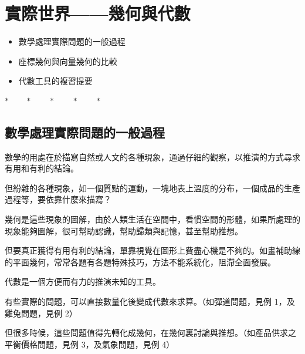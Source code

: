 
\section{實際世界——幾何與代數}
\label{sec:b3-ch1}

\begin{center}
\begin{minipage}{0.65\textwidth}
\begin{itemize}[leftmargin=2em, itemsep=0.3em]
  \item[§1-1] 數學處理實際問題的一般過程
  \item[§1-2] 座標幾何與向量幾何的比較
  \item[§1-3] 代數工具的複習提要
\end{itemize}
\end{minipage}
\end{center}

\begin{center}
$* \qquad * \qquad * \qquad * \qquad *$
\end{center}

\subsection{數學處理實際問題的一般過程}
\label{subsec:b3-1-1}

數學的用處在於描寫自然或人文的各種現象，通過仔細的觀察，以推演的方式尋求有用和有利的結論。

但紛雜的各種現象，如一個質點的運動，一塊地表上溫度的分布，一個成品的生產過程等，要依靠什麼來描寫？

幾何是這些現象的圖解，由於人類生活在空間中，看慣空間的形體，如果所處理的現象能夠圖解，很可幫助認識，幫助歸類與記憶，甚至幫助推想。

但要真正獲得有用有利的結論，單靠視覺在圖形上費盡心機是不夠的。如畫補助線的平面幾何，常常各題有各題特殊技巧，方法不能系統化，阻滯全面發展。

代數是一個方便而有力的推演未知的工具。

有些實際的問題，可以直接數量化後變成代數來求算。（如彈道問題，見例 1，及雞兔問題，見例 2）

但很多時候，這些問題值得先轉化成幾何，在幾何裏討論與推想。（如產品供求之平衡價格問題，見例 3，及氣象問題，見例 4）

